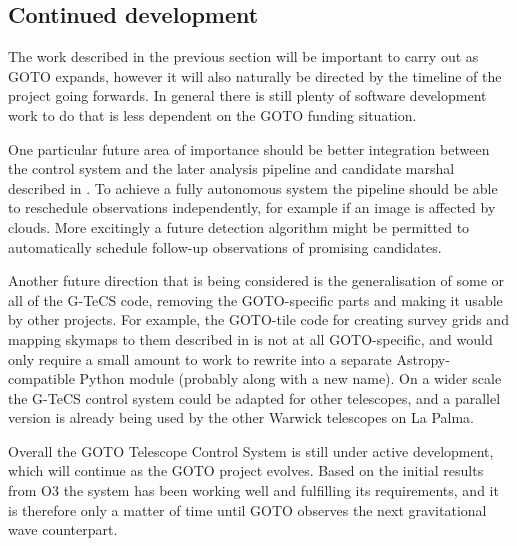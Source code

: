 \begin{colsection}
\begin{colsection}

\end{colsection}

\newpage
\subsection{Continued development}
\label{sec:software_future}
\begin{colsection}

The work described in the previous section will be important to carry out as GOTO expands, however it will also naturally be directed by the timeline of the project going forwards. In general there is still plenty of software development work to do that is less dependent on the GOTO funding situation.

One particular future area of importance should be better integration between the control system and the later analysis pipeline and candidate marshal described in . To achieve a fully autonomous system the pipeline should be able to reschedule observations independently, for example if an image is affected by clouds. More excitingly a future detection algorithm might be permitted to automatically schedule follow-up observations of promising candidates.

Another future direction that is being considered is the generalisation of some or all of the G-TeCS code, removing the GOTO-specific parts and making it usable by other projects. For example, the GOTO-tile code for creating survey grids and mapping skymaps to them described in  is not at all GOTO-specific, and would only require a small amount to work to rewrite into a separate Astropy-compatible Python module (probably along with a new name). On a wider scale the G-TeCS control system could be adapted for other telescopes, and a parallel version is already being used by the other Warwick telescopes on La Palma.

Overall the GOTO Telescope Control System is still under active development, which will continue as the GOTO project evolves. Based on the initial results from O3 the system has been working well and fulfilling its requirements, and it is therefore only a matter of time until GOTO observes the next gravitational wave counterpart.

\end{colsection}


\end{colsection}

